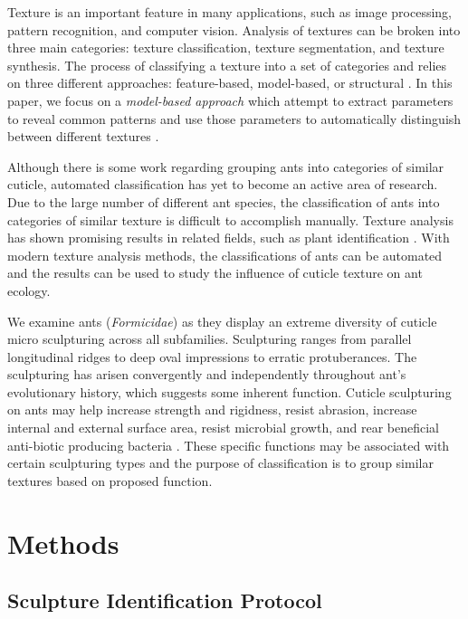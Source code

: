 \documentclass{aci}
\begin{document}
Texture is an important feature in many applications, such as image processing,
pattern recognition, and computer vision. Analysis of textures can be broken
into three main categories: texture classification, texture segmentation, and
texture synthesis. The process of classifying a texture into a set of categories
and relies on three different approaches: feature-based, model-based, or
structural \cite{reed_review_1993}. In this paper, we focus on a
\textit{model-based approach} which attempt to extract parameters to reveal
common patterns and use those parameters to automatically distinguish between
different textures \cite{maillard_texture_2003}.

Although there is some work regarding grouping ants into categories of similar
cuticle, automated classification has yet to become an active area of research.
Due to the large number of different ant species, the classification of ants
into categories of similar texture is difficult to accomplish manually. Texture
analysis has shown promising results in related fields, such as plant
identification \cite{boudra_plant_2018}. With modern texture analysis methods,
the classifications of ants can be automated and the results can be used to
study the influence of cuticle texture on ant ecology.

We examine ants (\textit{Formicidae}) as they display an extreme diversity of
cuticle micro sculpturing across all subfamilies. Sculpturing ranges from
parallel longitudinal ridges to deep oval impressions to erratic protuberances.
The sculpturing has arisen convergently and independently throughout ant’s
evolutionary history, which suggests some inherent function. Cuticle sculpturing
on ants may help increase strength and rigidness, resist abrasion, increase
internal and external surface area, resist microbial growth, and rear beneficial
anti-biotic producing bacteria \cite{johnson_effect_2011,
  bruckner_relationship_2017, currie_coevolved_2006}. These specific functions may
be associated with certain sculpturing types and the purpose of classification
is to group similar textures based on proposed function.

\section{Methods}

\subsection{Sculpture Identification Protocol}
\end{document}
